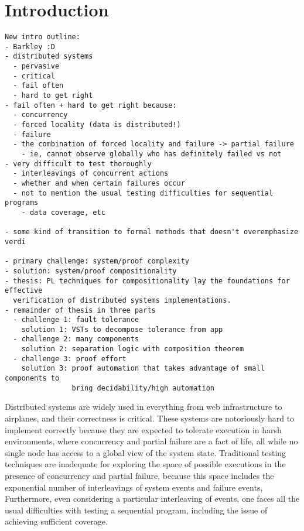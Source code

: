 \chapter{Introduction}
\label{chap:intro}

\begin{verbatim}
New intro outline:
- Barkley :D
- distributed systems
  - pervasive
  - critical
  - fail often
  - hard to get right
- fail often + hard to get right because:
  - concurrency
  - forced locality (data is distributed!)
  - failure
  - the combination of forced locality and failure -> partial failure
    - ie, cannot observe globally who has definitely failed vs not
- very difficult to test thoroughly
  - interleavings of concurrent actions
  - whether and when certain failures occur
  - not to mention the usual testing difficulties for sequential programs
    - data coverage, etc

- some kind of transition to formal methods that doesn't overemphasize verdi

- primary challenge: system/proof complexity
- solution: system/proof compositionality
- thesis: PL techniques for compositionality lay the foundations for effective
  verification of distributed systems implementations.
- remainder of thesis in three parts
  - challenge 1: fault tolerance
    solution 1: VSTs to decompose tolerance from app
  - challenge 2: many components
    solution 2: separation logic with composition theorem
  - challenge 3: proof effort
    solution 3: proof automation that takes advantage of small components to
                bring decidability/high automation
\end{verbatim}

Distributed systems are widely used
  in everything from web infrastructure to airplanes,
  and their correctness is critical.
These systems are notoriously hard to implement correctly
  because they are expected to tolerate execution in harsh environments,
  where concurrency and partial failure are a fact of life,
  all while no single node has access to a global view of the system state.
Traditional testing techniques are inadequate
  for exploring the space of possible executions
  in the presence of concurrency and partial failure,
  because this space includes the exponential number of
  interleavings of system events and failure events,
Furthermore, even considering a particular interleaving of events,
  one faces all the usual difficulties with testing a sequential program,
  including the issue of achieving sufficient coverage.

